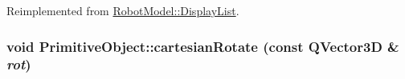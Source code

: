 Reimplemented from \hyperlink{class_robot_model_1_1_display_list_a9a7084168997ac285ee1e9f4041a8d57}{RobotModel::DisplayList}.\hypertarget{class_robot_model_1_1_primitive_object_a69c30287deb6549fbde68d1ba37424a8}{
\subsubsection[{cartesianRotate}]{\setlength{\rightskip}{0pt plus 5cm}void PrimitiveObject::cartesianRotate (const QVector3D \& {\em rot})}}
\label{class_robot_model_1_1_primitive_object_a69c30287deb6549fbde68d1ba37424a8}


